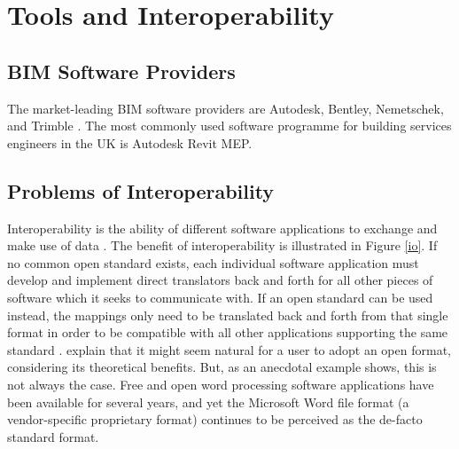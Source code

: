 \chapter{Tools and Interoperability} %

\label{Chapter7} %




\section{BIM Software Providers}

The market-leading BIM software providers are Autodesk, Bentley, Nemetschek, and Trimble \citep{Bosche, BusinessWire}.
The most commonly used software programme for building services engineers in the UK is Autodesk Revit MEP.



\section{Problems of Interoperability}
Interoperability is the ability of different software applications to exchange and make use of data \citep{Gallaher2004}.
The benefit of interoperability is illustrated in Figure \ref{io}. If no common open standard exists, each individual software application must develop and implement direct translators back and forth for all other pieces of software which it seeks to communicate with. If an open standard can be used instead, the mappings only need to be translated back and forth from that single format in order to be compatible with all other applications supporting the same standard \citep{Laakso2012}.
\cite{Laakso2012} explain that it might seem natural for a user to adopt an open format, considering its theoretical benefits.
But, as an anecdotal example shows, this is not always the case.
Free and open word processing software applications have been available for several years, and yet the Microsoft Word file format (a vendor-specific proprietary format) continues to be perceived as the de-facto standard format.

